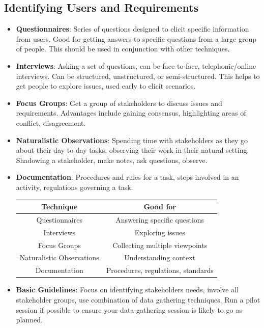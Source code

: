 \documentclass[a4paper]{article}
\begin{document}
\subsection{Identifying Users and Requirements}
\begin{itemize}
    \item \textbf{Questionnaires}: Series of questions designed to elicit specific information from users. Good for getting answers to specific questions from a large group of people. This should be used in conjunction with other techniques.
    \item \textbf{Interviews}: Asking a set of questions, can be face-to-face, telephonic/online interviews. Can be structured, unstructured, or semi-structured. This helps to get people to explore issues, used early to elicit scenarios.
    \item \textbf{Focus Groups}: Get a group of stakeholders to discuss issues and requirements. Advantages include gaining consensus, highlighting areas of conflict, disagreement.
    \item \textbf{Naturalistic Observations}: Spending time with stakeholders as they go about their day-to-day tasks, observing their work in their natural setting. Shadowing a stakeholder, make notes, ask questions, observe.
    \item \textbf{Documentation}: Procedures and rules for a task, steps involved in an activity, regulations governing a task.
    \begin{table}[H]
        \centering
        \begin{tabular}{|c|c|}
            \hline
            \textbf{Technique} & \textbf{Good for} \\
            \hline
            Questionnaires & Answering specific questions\\
            \hline
            Interviews & Exploring issues\\
            \hline
            Focus Groups & Collecting multiple viewpoints\\
            \hline
            Naturalistic Observations & Understanding context\\
            \hline
            Documentation & Procedures, regulations, standards\\
            \hline
        \end{tabular}
    \end{table}
    \item \textbf{Basic Guidelines}: Focus on identifying stakeholders needs, involve all stakeholder groups, use combination of data gathering techniques. Run a pilot session if possible to ensure your data-gathering session is likely to go as planned.

\end{itemize}
\end{document}
